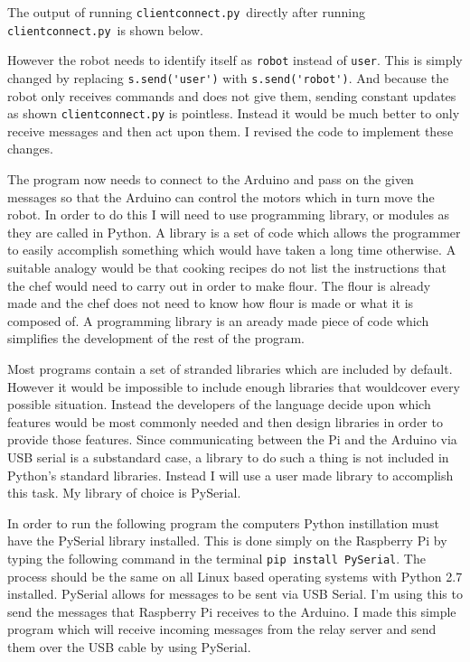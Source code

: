 \documentclass[]{report}   %
\begin{document}
						The output of running \lstinline{clientconnect.py}\  directly after running \lstinline{clientconnect.py}\ is shown below.
						
						
						However the robot needs to identify itself as \lstinline{robot} instead of \lstinline{user}. This is simply changed by replacing \lstinline{s.send('user')}
						with \lstinline{s.send('robot')}. And because the robot only receives commands and does not give them, sending constant updates as shown
						\lstinline{clientconnect.py} is pointless. Instead it would be much better to only receive messages and then act upon them. I revised the code to
						implement these changes. 	
						
						The program now needs to connect to the Arduino and pass on the given messages so that the Arduino can control the motors which in turn move the robot. In
						order to do this I will need to use programming library, or modules as they are called in Python. A library is a set of code which allows the programmer to
						easily accomplish something which would have taken a long time otherwise. A suitable analogy would be that cooking recipes do not list the instructions that
						the chef would need to carry out in order to make flour. The flour is already made and the chef does not need to know how flour is made or what it is
						composed of. A programming library is an aready made piece of code which simplifies the development of the rest of the program.
						
						Most programs contain a set of stranded libraries which are included by default. However it would be impossible to include enough libraries that wouldcover every
						possible situation. Instead the developers of the language decide upon which features would be most commonly needed and then design libraries in order to provide
						those features. Since communicating between the Pi and the Arduino via USB serial is a substandard case, a library to do such a thing is not included in Python's
						standard libraries. Instead I will use a user made library to accomplish this task. My library of choice is PySerial\cite{pyserial}.
						
						In order to run the following program the computers Python instillation must have the PySerial library installed. This is done simply on
						the Raspberry Pi by typing the following command in the terminal \lstinline{pip install PySerial}. The process should be the same on all
						Linux based operating systems with Python 2.7 installed. PySerial allows for messages to be sent via USB Serial. I'm using this to send
						the messages that Raspberry Pi receives to the Arduino. I made this simple program which will receive incoming messages from the relay
						server and send them over the USB cable by using PySerial.
						
						
\end{document}
